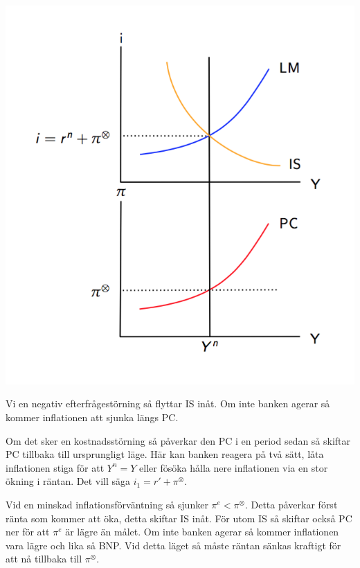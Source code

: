 \documentclass{article}
\begin{document}
\includegraphics[scale=0.5]{skarm11} 

\vspace{5mm} \par \noindent 

Vi en negativ efterfrågestörning så flyttar IS inåt. Om inte banken agerar så kommer inflationen att sjunka längs PC. \vspace{5mm} \par \noindent Om det sker en kostnadsstörning så påverkar den PC i en period sedan så skiftar PC tillbaka till ursprungligt läge. Här kan banken reagera på två sätt, låta inflationen stiga för att $ Y^n = Y $ eller fösöka hålla nere inflationen via en stor ökning i räntan. Det vill säga $ i_1 = r' + \pi^{\otimes} $. 

\vspace{5mm} \par \noindent 

Vid en minskad inflationsförväntning så sjunker $ \pi^e < \pi^{\otimes} $. Detta påverkar först ränta som kommer att öka, detta skiftar IS inåt. För utom IS så skiftar också PC ner för att $ \pi^e$ är lägre än målet. Om inte banken agerar så kommer inflationen vara lägre och lika så BNP. Vid detta läget så måste räntan sänkas kraftigt för att nå tillbaka till $ \pi^{\otimes}$. 
\end{document}
